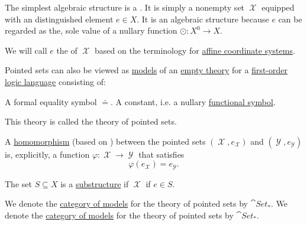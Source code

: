 \begin{definition}\label{def:pointed_set}
  The simplest algebraic structure is a . It is simply a nonempty set \( \mscrX \) equipped with an distinguished element \( e \in X \). It is an algebraic structure because \( e \) can be regarded as the, sole value of a nullary function \( \odot: X^0 \to X \).

  We will call \( e \) the  of \( \mscrX \) based on the terminology for \hyperref[def:euclidean_plane_coordinate_system/origin]{affine coordinate systems}.

  \begin{thmenum}
     Pointed sets can also be viewed as \hyperref[def:first_order_semantics/satisfiability]{models} of an \hyperref[def:first_order_theory]{empty theory} for a \hyperref[def:first_order_language]{first-order logic language} consisting of:
    \begin{thmenum}
       A formal equality symbol \( \doteq \).
       A constant, i.e. a nullary \hyperref[def:first_order_language/func]{functional symbol}.
    \end{thmenum}

    This theory is called the theory of pointed sets.

     A \hyperref[def:first_order_homomorphism]{homomorphism} (based on ) between the pointed sets \( (\mscrX, e_{\mscrX}) \) and \( (\mscrY, e_{\mscrY}) \) is, explicitly, a function \( \varphi: \mscrX \to \mscrY \) that satisfies
    \begin{equation}\label{eq:def:pointed_set/homomorphism}
      \varphi(e_{\mscrX}) = e_{\mscrY}.
    \end{equation}

     The set \( S \subseteq X \) is a \hyperref[def:first_order_substructure]{substructure} if \( \mscrX \) if \( e \in S \).

     We denote the \hyperref[def:category_of_small_first_order_models]{category of models} for the theory of pointed sets by \( \cat{Set}_* \). We denote the \hyperref[def:category_of_small_first_order_models]{category of models} for the theory of pointed sets by \( \cat{Set}_* \).
  \end{thmenum}
\end{definition}
